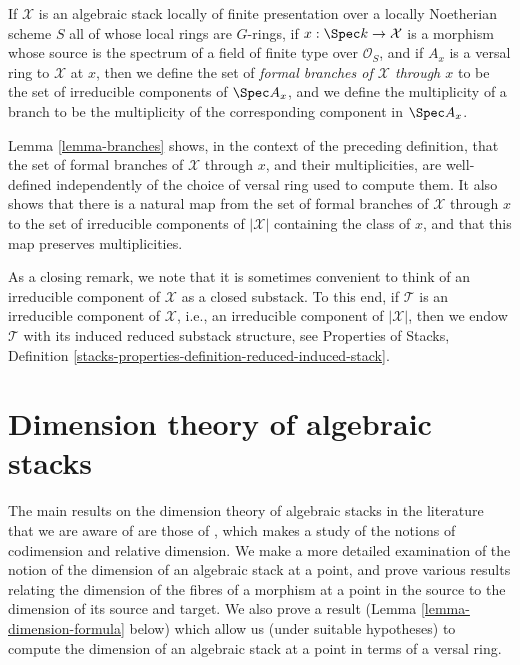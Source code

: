 \begin{definition}
\label{definition-formal-branches}
If $\mathcal{X}$ is an algebraic stack locally of finite presentation
over a locally Noetherian scheme $S$ all of whose local rings are $G$-rings,
if $x: \Spec k \to \mathcal{X}$ is a morphism whose source is the spectrum
of a field of finite type over $\mathcal{O}_S$,
and if $A_x$ is a versal ring to $\mathcal{X}$ at $x$,
then we define the set of
{\it formal branches of $\mathcal{X}$ through $x$} to be
the set of irreducible components of $\Spec A_x$,
and we define the multiplicity of a branch to be the multiplicity
of the corresponding component in $\Spec A_x$.
\end{definition}

\noindent
Lemma \ref{lemma-branches} shows, in the context of the preceding
definition, that the set of formal branches of $\mathcal{X}$ through $x$,
and their multiplicities, are well-defined independently of
the choice of versal ring used to compute them.  It also
shows that there is a natural map from the set
of formal branches of $\mathcal{X}$ through $x$ to the set of irreducible
components of $|\mathcal{X}|$ containing the class of $x$,
and that this map preserves multiplicities.

\medskip\noindent
As a closing remark, we note that it is sometimes convenient to think
of an irreducible component of $\mathcal{X}$ as a closed substack.
To this end, if $\mathcal{T}$ is an irreducible component of
$\mathcal{X}$, i.e., an irreducible component of $|\mathcal{X}|$,
then we endow $\mathcal{T}$ with its induced reduced substack structure, see
Properties of Stacks, Definition
\ref{stacks-properties-definition-reduced-induced-stack}.













\section{Dimension theory of algebraic stacks}
\label{section-dimension-of-algebraic-stacks}

\noindent
The main results on the dimension theory of algebraic stacks in the
literature that we are aware of are those of \cite{Osserman}, which
makes a study of the notions of codimension and relative dimension. We
make a more detailed examination of the notion of the dimension of an
algebraic stack at a point, and prove various results
relating the dimension of the fibres of a morphism at a point in the source
to the dimension of its source and target.  We also prove a result
(Lemma \ref{lemma-dimension-formula} below) which
allow us (under suitable hypotheses) to compute the dimension of
an algebraic stack at a point in terms of a versal ring.

